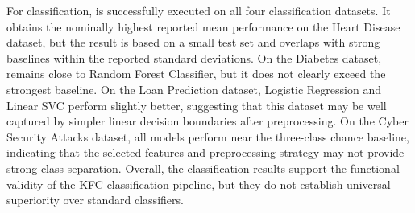 


For classification,  is successfully executed on all four classification datasets. It obtains the nominally highest reported mean performance on the Heart Disease dataset, but the result is based on a small test set and overlaps with strong baselines within the reported standard deviations. On the Diabetes dataset,  remains close to Random Forest Classifier, but it does not clearly exceed the strongest baseline. On the Loan Prediction dataset, Logistic Regression and Linear SVC perform slightly better, suggesting that this dataset may be well captured by simpler linear decision boundaries after preprocessing. On the Cyber Security Attacks dataset, all models perform near the three-class chance baseline, indicating that the selected features and preprocessing strategy may not provide strong class separation. Overall, the classification results support the functional validity of the KFC classification pipeline, but they do not establish universal superiority over standard classifiers.

